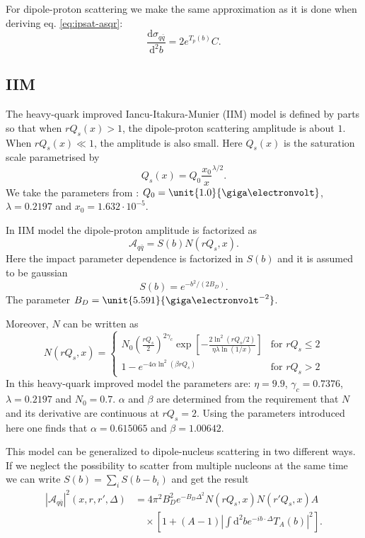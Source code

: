\documentclass[a4paper,12pt]{article}
\newcommand{\der}{\mathrm{d}}
\newcommand{\A}{\mathcal{A}}
\begin{document}
For dipole-proton scattering we make the same approximation as it is done when deriving eq. \eqref{eq:ipsat-asqr}:
\begin{equation}
	\frac{\der \sigma_{q\bar q}}{\der^2 b} = 2 e^{T_p(b)}C.
\end{equation}

\subsection{IIM}
The heavy-quark improved Iancu-Itakura-Munier (IIM) model is defined by parts so that when $rQ_s(x)>1$, the dipole-proton scattering amplitude is about $1$. When $rQ_s(x) \ll 1$, the amplitude is also small. Here $Q_s(x)$ is the saturation scale parametrised by
\begin{equation}
	Q_s(x) = Q_0 \frac{x_0}{x}^{\lambda/2}.
\end{equation}
We take the parameters from \cite{Marquet:2007nf}: $Q_0 = \unit{1.0}{\giga\electronvolt}$, $\lambda = 0.2197$ and $x_0 = 1.632 \cdot 10^{-5}$.

In IIM model the dipole-proton amplitude is factorized as
\begin{equation}
	\label{eq:iim-a}
	\A_{q\bar q} = S(b) N(rQ_s,x).
\end{equation}
Here the impact parameter dependence is factorized in $S(b)$ and it is assumed to be gaussian
\begin{equation}
	S(b) = e^{-b^2/(2B_D)}.
\end{equation}
The parameter $B_D = \unit{5.591}{\giga\electronvolt^{-2}}$.

Moreover, $N$ can be written as
\begin{equation}
N(rQ_s,x) = \begin{cases}
	N_0\left( \frac{rQ_s}{2} \right)^{2\gamma_c} \exp \left[ -\frac{2 \ln^2 (rQ_s/2) }{\eta \lambda \ln (1/x)} \right] & \text{for } rQ_s \leq 2  \\
	1-e^{-4\alpha \ln^2 (\beta rQ_s)} & \text{for } rQ_s > 2	
	\end{cases}
\end{equation}
In this heavy-quark improved model the parameters are: $\eta = 9.9$, $\gamma_c = 0.7376$, $\lambda=0.2197$ and $N_0 = 0.7$. $\alpha$ and $\beta$ are determined from the requirement that $N$ and its derivative are continuous at $rQ_s=2$. Using the parameters introduced here one finds that $\alpha = 0.615065$ and $\beta = 1.00642$.

This model can be generalized to dipole-nucleus scattering in two different ways. If we neglect the possibility to scatter from multiple nucleons at the same time we can write $S(b) = \sum_i S(b-b_i)$ and get the result
\begin{equation}
\begin{split}
	|\A_{q\bar q}|^2(x,r,r',\Delta) &= 4\pi^2B_D^2 e^{-B_D \Delta^2} N(rQ_s,x)N(r'Q_s,x) A \\
	&\quad \times \left[1 + (A-1) \left| \int \der^2 b e^{-ib \cdot \Delta} T_A(b) \right|^2 \right] . 
\end{split}
\end{equation}
\end{document}
